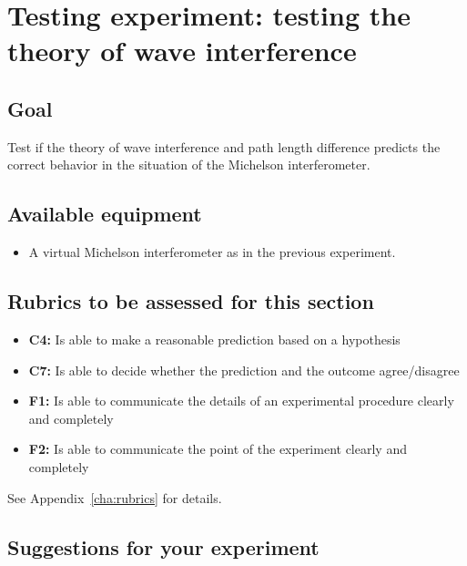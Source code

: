 \section{Testing experiment: testing the theory of wave interference}

\subsection{Goal}

Test if the theory of wave interference and path length difference predicts the correct behavior in the situation of the Michelson interferometer.

\subsection{Available equipment}

\begin{itemize}
	\item A virtual Michelson interferometer as in the previous experiment.
\end{itemize}

\subsection{Rubrics to be assessed for this section}

\begin{itemize}
	\item \textbf{C4:} Is able to make a reasonable prediction based on a hypothesis
	\item \textbf{C7:} Is able to decide whether the prediction and the outcome agree/disagree
	\item \textbf{F1:} Is able to communicate the details of an experimental procedure clearly and completely
	\item \textbf{F2:} Is able to communicate the point of the experiment clearly and completely
\end{itemize}
See Appendix~\ref{cha:rubrics} for details.

\subsection{Suggestions for your experiment}

